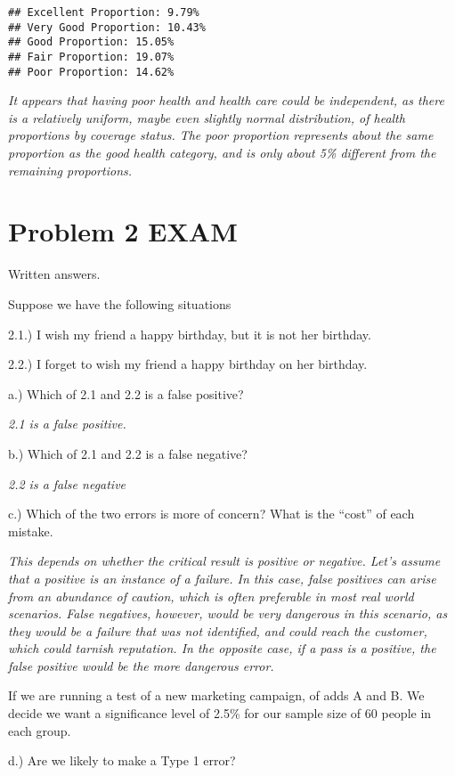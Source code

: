 \documentclass[
]{article}
\begin{document}
\begin{verbatim}
## Excellent Proportion: 9.79%
## Very Good Proportion: 10.43%
## Good Proportion: 15.05%
## Fair Proportion: 19.07%
## Poor Proportion: 14.62%
\end{verbatim}

\emph{It appears that having poor health and health care could be
independent, as there is a relatively uniform, maybe even slightly
normal distribution, of health proportions by coverage status. The poor
proportion represents about the same proportion as the good health
category, and is only about 5\% different from the remaining
proportions.}

\section{Problem 2 EXAM}\label{problem-2-exam}

Written answers.

Suppose we have the following situations

2.1.) I wish my friend a happy birthday, but it is not her birthday.

2.2.) I forget to wish my friend a happy birthday on her birthday.

a.) Which of 2.1 and 2.2 is a false positive?

\emph{2.1 is a false positive.}

b.) Which of 2.1 and 2.2 is a false negative?

\emph{2.2 is a false negative}

c.) Which of the two errors is more of concern? What is the ``cost'' of
each mistake.

\emph{This depends on whether the critical result is positive or
negative. Let's assume that a positive is an instance of a failure. In
this case, false positives can arise from an abundance of caution, which
is often preferable in most real world scenarios. False negatives,
however, would be very dangerous in this scenario, as they would be a
failure that was not identified, and could reach the customer, which
could tarnish reputation. In the opposite case, if a pass is a positive,
the false positive would be the more dangerous error.}

If we are running a test of a new marketing campaign, of adds A and B.
We decide we want a significance level of 2.5\% for our sample size of
60 people in each group.

d.) Are we likely to make a Type 1 error?
\end{document}
